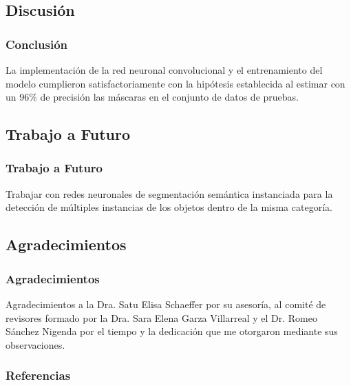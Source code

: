 \documentclass{beamer}
\begin{document}
\subsection{Discusión}
\begin{frame}
    \frametitle{Conclusión}
    La implementación de la red neuronal convolucional y el entrenamiento del modelo cumplieron satisfactoriamente con la hipótesis establecida al estimar con un 96\% de precisión las máscaras en el conjunto de datos de pruebas.
\end{frame}


\subsection{Trabajo a Futuro}
\begin{frame}
    \frametitle{Trabajo a Futuro}
    Trabajar con redes neuronales de segmentación semántica instanciada para la detección de múltiples instancias de los objetos dentro de la misma categoría. 
\end{frame}

\subsection{Agradecimientos}
\begin{frame}
    \frametitle{Agradecimientos}
    Agradecimientos a la Dra. Satu Elisa Schaeffer por su asesoría, al comité de revisores formado por la Dra. Sara Elena Garza Villarreal y el Dr. Romeo Sánchez Nigenda por el tiempo y la dedicación que me otorgaron mediante sus observaciones.
\end{frame}

\begin{frame}[allowframebreaks]
    \footnotesize
    \nocite{adam_opt}
    \frametitle{Referencias}
    
    
    
    
\end{frame}
\end{document}
